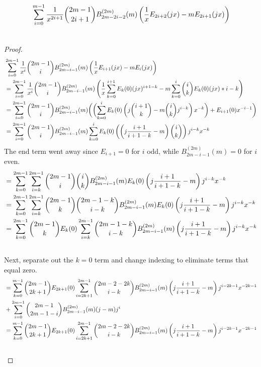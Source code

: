 \documentclass[fleqn,a4paper,9pt]{article}
\begin{document}
\begin{flushleft}
\begin{lemma}
\begin{align}
&\sum_{i=0}^{m-1}\frac{1}{x^{2i+1}}\binom{2m-1}{2i+1}B_{2m-2i-2}^{(2m)}(m)\left(\frac{1}{x}E_{2i+2}(jx)-mE_{2i+1}(jx)\right)\\\notag
\end{align}
\end{lemma}
\begin{proof}
\begin{align}
&\sum_{i=0}^{2m-1}\frac{1}{x^i}\binom{2m-1}{i}B_{2m-i-1}^{(2m)}(m)\left(\frac{1}{x}E_{i+1}(jx)-mE_i(jx)\right)\\\notag
&=\sum_{i=0}^{2m-1}\frac{1}{x^i}\binom{2m-1}{i}B_{2m-i-1}^{(2m)}(m)\left(\frac{1}{x}\sum_{k=0}^{i+1}E_{k}(0)(jx)^{i+1-k}-m\sum_{k=0}^i\binom{i}{k}E_k(0)(jx)*{i-k}\right)\\\notag
&=\sum_{i=0}^{2m-1}\binom{2m-1}{i}B_{2m-i-1}^{(2m)}(m)\biggl(\biggl (\sum_{k=0}^{i}E_{k}(0)\left(j\binom{i+1}{k}-m\binom{i}{k}j^{i-k}\right)x^{-k}\biggr)+E_{i+1}(0)x^{-i-1}\biggr)\\\notag
&=\sum_{i=0}^{2m-1}\binom{2m-1}{i}B_{2m-i-1}^{(2m)}(m)\sum_{k=0}^{i}E_{k}(0)\left(    \left(j\frac{i+1}{i+1-k}-m\right)\binom{i}{k}\right)j^{i-k}x^{-k}
\end{align}
The end term went away since $E_{i+1}=0$ for $i$ odd, while $B_{2m-i-1}^{(2m)}(m)=0$ for $i$ even.
\begin{align}
&=\sum_{k=0}^{2m-1}\sum_{i=k}^{2m-1}\binom{2m-1}{i}\binom{i}{k}B_{2m-i-1}^{(2m)}(m)E_{k}(0)  \left(j\frac{i+1}{i+1-k}-m\right)j^{i-k}x^{-k}\\\notag
&=\sum_{k=0}^{2m-1}\sum_{i=k}^{2m-1}\binom{2m-1}{k}\binom{2m-1-k}{i-k}B_{2m-i-1}^{(2m)}(m)E_{k}(0) \left(j\frac{i+1}{i+1-k}-m\right)j^{i-k}x^{-k}\\\notag
&=\sum_{k=0}^{2m-1}\binom{2m-1}{k}E_{k}(0)\sum_{i=k}^{2m-1}\binom{2m-1-k}{i-k}B_{2m-i-1}^{(2m)}(m) \left(j\frac{i+1}{i+1-k}-m\right)j^{i-k}x^{-k}\\\notag
\end{align}
Next, separate out the $k=0$ term and change indexing to eliminate terms that equal zero.
\begin{align}\notag
&=\sum_{k=0}^{m-1}\binom{2m-1}{2k+1}E_{2k+1}(0)\sum_{i=2k+1}^{2m-1}\binom{2m-2-2k}{i-k}B_{2m-i-1}^{(2m)}(m)   \left(j\frac{i+1}{i+1-k}-m\right)j^{i-2k-1}x^{-2k-1}\\\notag
&+\sum_{i=0}^{2m-1}\binom{2m-1}{2m-1-i}B_{2m-i-1}^{(2m)}(m)( j-m ) j^i\\\notag
&=\sum_{k=0}^{m-1}\binom{2m-1}{2k+1}E_{2k+1}(0)\sum_{i=2k+1}^{2m-1}\binom{2m-2-2k}{i-k}B_{2m-i-1}^{(2m)}(m) \left(j\frac{i+1}{i+1-k}-m\right)j^{i-2k-1}x^{-2k-1}\\\notag

\end{align}
\end{proof}
\end{flushleft}
\end{document}
